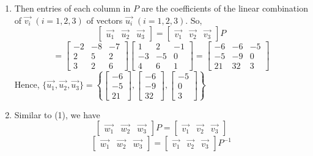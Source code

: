 \documentclass{article}
\begin{document}
\begin{enumerate} [label={(\arabic*)}]
\item
    Then entries of each column in $P$ are the coefficients of the linear combination of $\Vec{v_i}$ $(i=1,2,3)$ of vectors $\Vec{u_i}$ $(i=1,2,3)$. So, 
     \[\left[\begin{array}{rrr}\Vec{u_1}&\Vec{u_2}&\Vec{u_3}\end{array}\right]=\left[\begin{array}{rrr}\Vec{v_1}&\Vec{v_2}&\Vec{v_3}\end{array}\right]P\]
    \[=\left[\begin{array}{rrr}-2&-8&-7\\2&5&2\\3&2&6\end{array}\right]\left[\begin{array}{rrr}
1 & 2 &-1 \\
-3 & -5 & 0 \\
4 & 6 & 1
\end{array}\right]=\left[\begin{array}{rrr}
-6 & -6 & -5 \\-5 & -9 & 0 \\21 & 32 & 3
\end{array}\right]\]
Hence, $\{\Vec{u_1},\Vec{u_2},\Vec{u_3}\}=\left\{\left[\begin{array}{r}-6\\-5\\21\end{array}\right],\left[\begin{array}{r}-6\\-9\\32\end{array}\right],\left[\begin{array}{r}-5\\0\\3\end{array}\right]\right\}$
\item Similar to (1), we have
\[\left[\begin{array}{rrr}\Vec{w_1}&\Vec{w_2}&\Vec{w_3}\end{array}\right]P=\left[\begin{array}{rrr}\Vec{v_1}&\Vec{v_2}&\Vec{v_3}\end{array}\right]\]
\[\left[\begin{array}{rrr}\Vec{w_1}&\Vec{w_2}&\Vec{w_3}\end{array}\right]=\left[\begin{array}{rrr}\Vec{v_1}&\Vec{v_2}&\Vec{v_3}\end{array}\right]P^{-1}\]

\end{enumerate}
\end{document}
